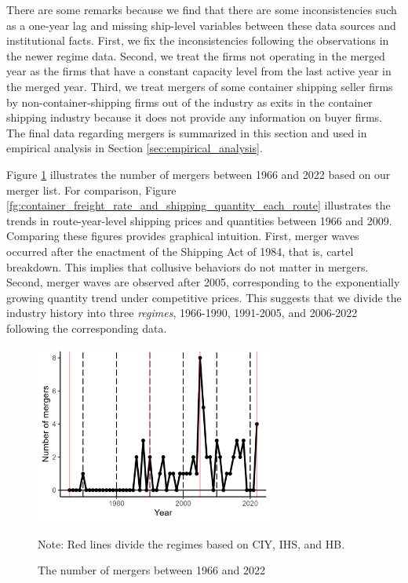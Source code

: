 \documentclass[10pt]{article}
\begin{document}
There are some remarks because we find that there are some inconsistencies such as a one-year lag and missing ship-level variables between these data sources and institutional facts. 
First, we fix the inconsistencies following the observations in the newer regime data. 
Second, we treat the firms not operating in the merged year as the firms that have a constant capacity level from the last active year in the merged year. %
Third, we treat mergers of some container shipping seller firms by non-container-shipping firms out of the industry as exits in the container shipping industry because it does not provide any information on buyer firms.
The final data regarding mergers is summarized in this section and used in empirical analysis in Section \ref{sec:empirical_analysis}.

Figure \ref{fg:number_of_mergers} illustrates the number of mergers between 1966 and 2022 based on our merger list.
For comparison, Figure \ref{fg:container_freight_rate_and_shipping_quantity_each_route} illustrates the trends in route-year-level shipping prices and quantities between 1966 and 2009.
Comparing these figures provides graphical intuition. 
First, merger waves occurred after the enactment of the Shipping Act of 1984, that is, cartel breakdown.
This implies that collusive behaviors do not matter in mergers.
Second, merger waves are observed after 2005, corresponding to the exponentially growing quantity trend under competitive prices. 
This suggests that we divide the industry history into three \textit{regimes}, 1966-1990, 1991-2005, and 2006-2022 following the corresponding data.


\begin{figure}[!ht]
\begin{center}
  \includegraphics[width = 0.7\textwidth]
  {figuretable/number_of_mergers.png}
  \caption{The number of mergers between 1966 and 2022}
  \label{fg:number_of_mergers}
  \end{center}
\footnotesize
   Note: Red lines divide the regimes based on CIY, IHS, and HB.
\end{figure}
\end{document}

